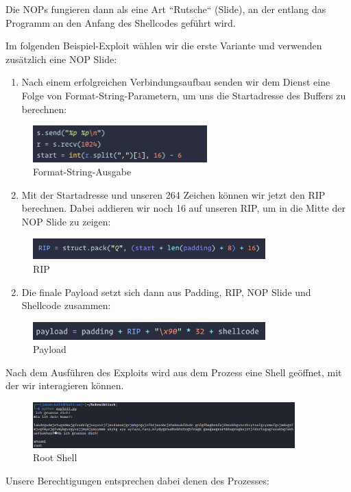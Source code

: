 Die NOPs fungieren dann als eine Art “Rutsche“ (Slide), an der entlang das Programm an den Anfang des
Shellcodes geführt wird. \cite{computerphile} \cite{phrack}

\pagebreak

Im folgenden Beispiel-Exploit wählen wir die erste Variante und verwenden zusätzlich eine NOP Slide:
\begin{enumerate}
    \item Nach einem erfolgreichen Verbindungsaufbau senden wir dem Dienst eine Folge von Format-String-Parametern, um uns die Startadresse des Buffers zu berechnen:
\end{enumerate}
\begin{figure}[h]
    \centering
    \includegraphics[width=0.6\textwidth,height=0.75\textheight,keepaspectratio]{images/format.png}
    \caption{Format-String-Ausgabe}
\end{figure}

\begin{enumerate}
    \setcounter{enumi}{1}
    \item Mit der Startadresse und unseren 264 Zeichen können wir jetzt den RIP berechnen. Dabei addieren wir noch 16 auf unseren RIP, um in die Mitte der NOP Slide zu zeigen:
\end{enumerate}
\begin{figure}[h]
    \centering
    \includegraphics[width=0.8\textwidth,keepaspectratio]{images/rip.png}
    \caption{RIP}
\end{figure}

\begin{enumerate}
    \setcounter{enumi}{1}
    \item Die finale Payload setzt sich dann aus Padding, RIP, NOP Slide und Shellcode zusammen:
\end{enumerate}
\begin{figure}[h]
    \centering
    \includegraphics[width=0.8\textwidth,keepaspectratio]{images/payload.png}
    \caption{Payload}
\end{figure}

Nach dem Ausführen des Exploits wird aus dem Prozess eine Shell geöffnet, mit der wir interagieren können.
\begin{figure}[b!]
    \centering
    \includegraphics[width=0.9\textwidth,keepaspectratio]{images/root.png}
    \caption{Root Shell}
\end{figure}
Unsere Berechtigungen entsprechen dabei denen des Prozesses:

